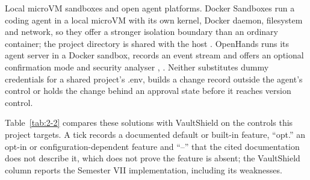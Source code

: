 \documentclass[12pt,a4paper,oneside]{report}
\begin{document}
Local microVM sandboxes and open agent platforms. Docker Sandboxes run a coding agent in a local microVM with its own kernel, Docker daemon, filesystem and network, so they offer a stronger isolation boundary than an ordinary container; the project directory is shared with the host \cite{ref20}. OpenHands runs its agent server in a Docker sandbox, records an event stream and offers an optional confirmation mode and security analyser \cite{ref4}, \cite{ref21}. Neither substitutes dummy credentials for a shared project's .env, builds a change record outside the agent's control or holds the change behind an approval state before it reaches version control.

Table~\ref{tab:2-2} compares these solutions with VaultShield on the controls this project targets. A tick records a documented default or built-in feature, ``opt.'' an opt-in or configuration-dependent feature and ``--'' that the cited documentation does not describe it, which does not prove the feature is absent; the VaultShield column reports the Semester VII implementation, including its weaknesses.
\end{document}
